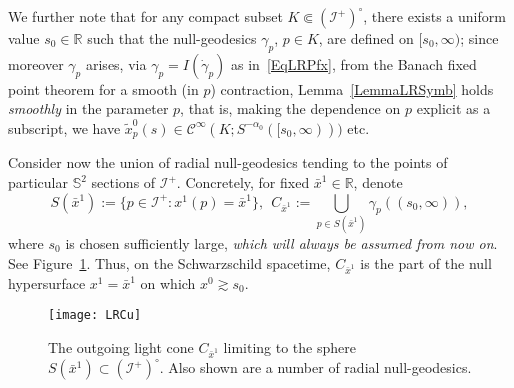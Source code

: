 \documentclass[reqno,11pt,letterpaper]{amsart}
\numberwithin{equation}{section}
\numberwithin{figure}{section}
\theoremstyle{definition}
\theoremstyle{remark}
\newcommand{\mc}{\mathcal}
\newcommand{\cC}{\mc C}
\newcommand{\ms}{\mathscr}
\newcommand{\scri}{\ms I}
\newcommand{\R}{\mathbb{R}}
\newcommand{\Sph}{\mathbb{S}}
\newcommand{\wt}{\widetilde}
\newcommand{\CI}{\cC^\infty}
\begin{document}
We further note that for any compact subset $K\Subset(\scri^+)^\circ$, there exists a uniform value $s_0\in\R$ such that the null-geodesics $\gamma_p$, $p\in K$, are defined on $[s_0,\infty)$; since moreover $\gamma_p$ arises, via $\gamma_p=I(\dot\gamma_p)$ as in~\eqref{EqLRPfx}, from the Banach fixed point theorem for a smooth (in $p$) contraction, Lemma~\ref{LemmaLRSymb} holds \emph{smoothly} in the parameter $p$, that is, making the dependence on $p$ explicit as a subscript, we have $\wt x^0_p(s)\in \CI(K;S^{-\alpha_0}([s_0,\infty)))$ etc.

Consider now the union of radial null-geodesics tending to the points of particular $\Sph^2$ sections of $\scri^+$. Concretely, for fixed $\bar x^1\in\R$, denote
\begin{equation}
\label{EqLRSpheres}
  S(\bar x^1):=\{p\in\scri^+\colon x^1(p)=\bar x^1\},\ \ 
  C_{\bar x^1}:=\bigcup_{p\in S(\bar x^1)} \gamma_p((s_0,\infty)),
\end{equation}
where $s_0$ is chosen sufficiently large, \emph{which will always be assumed from now on}. See Figure~\ref{FigLRCu}. Thus, on the Schwarzschild spacetime, $C_{\bar x^1}$ is the part of the null hypersurface $x^1=\bar x^1$ on which $x^0\gtrsim s_0$.

\begin{figure}[!ht]
\texttt{[image: LRCu]}
\caption{The outgoing light cone $C_{\bar x^1}$ limiting to the sphere $S(\bar x^1)\subset(\scri^+)^\circ$. Also shown are a number of radial null-geodesics.}
\label{FigLRCu}
\end{figure}
\end{document}
